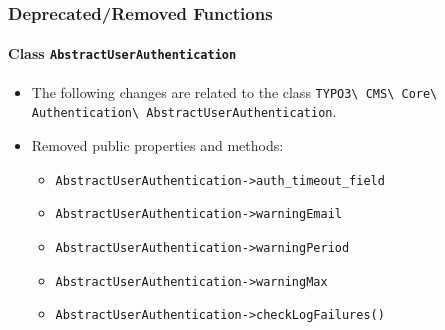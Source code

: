 %

\begin{frame}[fragile]
	\frametitle{Deprecated/Removed Functions}
	\framesubtitle{Class \texttt{AbstractUserAuthentication}}

	\begin{itemize}
		\item The following changes are related to the class\newline
			\texttt{TYPO3\textbackslash
				CMS\textbackslash
				Core\textbackslash
				Authentication\textbackslash
				AbstractUserAuthentication}.

		\item Removed public properties and methods:

			\begin{itemize}\small
				\item \texttt{AbstractUserAuthentication->auth\_timeout\_field}
				\item \texttt{AbstractUserAuthentication->warningEmail}
				\item \texttt{AbstractUserAuthentication->warningPeriod}
				\item \texttt{AbstractUserAuthentication->warningMax}
				\item \texttt{AbstractUserAuthentication->checkLogFailures()}
			\end{itemize}\normalsize

	\end{itemize}

\end{frame}

